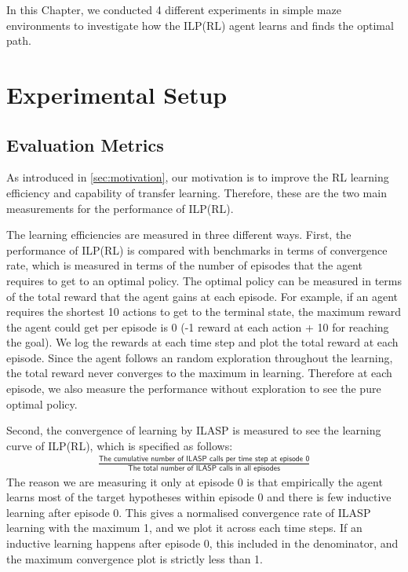 In this Chapter, we conducted 4 different experiments in simple maze environments to investigate how the ILP(RL) agent learns and finds the optimal path.

\section{Experimental Setup}
\label{sec:experimental_setup}

\subsection{Evaluation Metrics}
\label{subsec:evaluation_metrics}

As introduced in \ref{sec:motivation}, our motivation is to improve the RL learning efficiency and capability of transfer learning.
Therefore, these are the two main measurements for the performance of ILP(RL).

The learning efficiencies are measured in three different ways. First, the performance of ILP(RL) is compared with benchmarks in terms of
convergence rate, which is measured in terms of the number of episodes that the agent requires to get to an optimal policy.
The optimal policy can be measured in terms of the total reward that the agent gains at each episode. 
For example, if an agent requires the shortest 10 actions to get to the terminal state, the maximum reward the agent could get per episode is 0 (-1 reward at each action + 10 for reaching the goal).
We log the rewards at each time step and plot the total reward at each episode. 
Since the agent follows an random exploration throughout the learning, the total reward never converges to the maximum in learning. 
Therefore at each episode, we also measure the performance without exploration to see the pure optimal policy.

Second, the convergence of learning by ILASP is measured to see the learning curve of ILP(RL), which is specified as follows:
\begin{equation}
\begin{split}
\frac{\textsf{The cumulative number of ILASP calls per time step at episode 0}}{\textsf{The total number of ILASP calls in all episodes}}
\end{split}
\end{equation}
The reason we are measuring it only at episode 0 is that empirically the agent learns most of the target hypotheses within episode 0 and there is few inductive learning after episode 0.
This gives a normalised convergence rate of ILASP learning with the maximum 1, and we plot it across each time steps. 
If an inductive learning happens after episode 0, this included in the denominator, and the maximum convergence plot is strictly less than 1.

